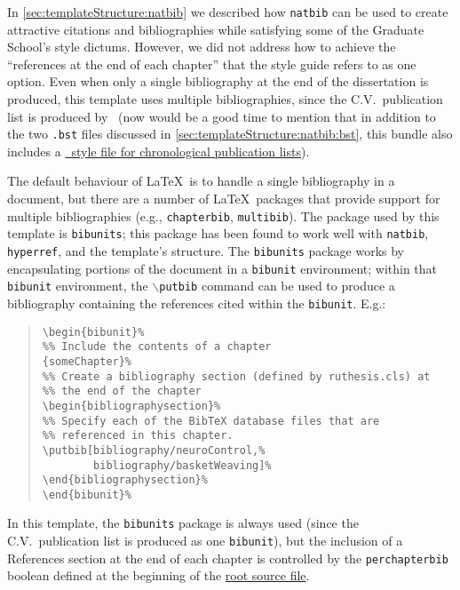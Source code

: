 In \autoref{sec:templateStructure:natbib} we described how \texttt{natbib} can be used to create attractive citations and bibliographies while satisfying some of the Graduate School's style dictums.
However, we did not address how to achieve the ``references at the end of each chapter'' that the style guide refers to as one option.
Even when only a single bibliography at the end of the dissertation is produced, this template uses multiple bibliographies, since the C.V.\ publication list is produced by \BibTeX\ (now would be a good time to mention that in addition to the two \texttt{.bst} files discussed in \autoref{sec:templateStructure:natbib:bst}, this bundle also includes a \href{../bibtexery/ruvita.bst}{\BibTeX\ style file for chronological publication lists}).

The default behaviour of \LaTeX\ is to handle a single bibliography in a document, but there are a number of \LaTeX\ packages that provide support for multiple bibliographies (e.g., \texttt{chapterbib}, \texttt{multibib}).
The package used by this template is \texttt{bibunits}; this package has been found to work well with \texttt{natbib}, \texttt{hyperref}, and the template's structure.
The \texttt{bibunits} package works by encapsulating portions of the document in a \texttt{bibunit} environment; within that \texttt{bibunit} environment, the $\backslash$\texttt{putbib} command can be used to produce a bibliography containing the references cited within the \texttt{bibunit}.
E.g.:
\begin{quotation}%
\begin{verbatim}
\begin{bibunit}%
%% Include the contents of a chapter
{someChapter}%
%% Create a bibliography section (defined by ruthesis.cls) at
%% the end of the chapter
\begin{bibliographysection}%
%% Specify each of the BibTeX database files that are
%% referenced in this chapter.
\putbib[bibliography/neuroControl,%
        bibliography/basketWeaving]%
\end{bibliographysection}%
\end{bibunit}%
\end{verbatim}%
\end{quotation}%

In this template, the \texttt{bibunits} package is always used (since the C.V.\ publication list is produced as one \texttt{bibunit}), but the inclusion of a References section at the end of each chapter is controlled by the \texttt{perchapterbib} boolean defined at the beginning of the \href{./dissertation.tex}{root source file}.

